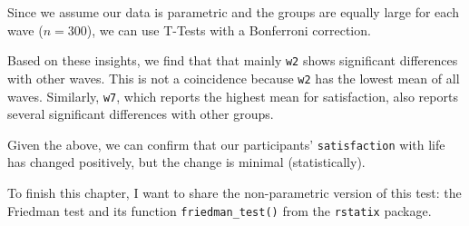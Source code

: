\documentclass[
]{book}
\newenvironment{Shaded}{\begin{snugshade}}{\end{snugshade}}
\newcommand{\AttributeTok}[1]{\textcolor[rgb]{0.77,0.63,0.00}{#1}}
\newcommand{\ConstantTok}[1]{\textcolor[rgb]{0.00,0.00,0.00}{#1}}
\newcommand{\DocumentationTok}[1]{\textcolor[rgb]{0.56,0.35,0.01}{\textbf{\textit{#1}}}}
\newcommand{\FunctionTok}[1]{\textcolor[rgb]{0.00,0.00,0.00}{#1}}
\newcommand{\NormalTok}[1]{#1}
\newcommand{\SpecialCharTok}[1]{\textcolor[rgb]{0.00,0.00,0.00}{#1}}
\newcommand{\StringTok}[1]{\textcolor[rgb]{0.31,0.60,0.02}{#1}}
\begin{document}
Since we assume our data is parametric and the groups are equally large for each wave (\(n = 300\)), we can use T-Tests with a Bonferroni correction.

\begin{Shaded}
\end{Shaded}

Based on these insights, we find that that mainly \texttt{w2} shows significant differences with other waves. This is not a coincidence because \texttt{w2} has the lowest mean of all waves. Similarly, \texttt{w7}, which reports the highest mean for satisfaction, also reports several significant differences with other groups.

Given the above, we can confirm that our participants' \texttt{satisfaction} with life has changed positively, but the change is minimal (statistically).

To finish this chapter, I want to share the non-parametric version of this test: the Friedman test and its function \texttt{friedman\_test()} from the \texttt{rstatix} package.
\end{document}
